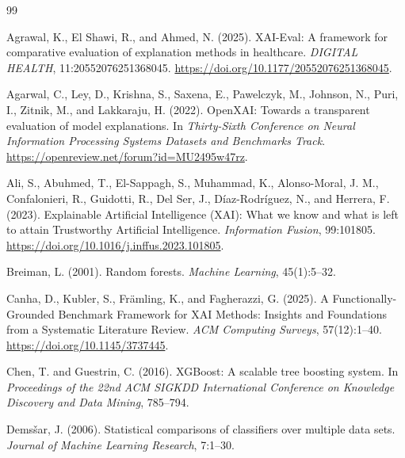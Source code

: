 \documentclass[twoside,11pt]{article}
\begin{document}
\clearpage
{}
{}
\begin{thebibliography}{99}

Agrawal, K., El Shawi, R., and Ahmed, N. (2025).
XAI-Eval: A framework for comparative evaluation of explanation methods
in healthcare.
\emph{DIGITAL HEALTH}, 11:20552076251368045.
\url{https://doi.org/10.1177/20552076251368045}.

Agarwal, C., Ley, D., Krishna, S., Saxena, E., Pawelczyk, M., Johnson, N.,
Puri, I., Zitnik, M., and Lakkaraju, H. (2022).
OpenXAI: Towards a transparent evaluation of model explanations.
In \emph{Thirty-Sixth Conference on Neural Information Processing Systems
Datasets and Benchmarks Track}.
\url{https://openreview.net/forum?id=MU2495w47rz}.

Ali, S., Abuhmed, T., El-Sappagh, S., Muhammad, K., Alonso-Moral, J. M.,
Confalonieri, R., Guidotti, R., Del Ser, J., D\'{i}az-Rodr\'{i}guez, N.,
and Herrera, F. (2023).
Explainable Artificial Intelligence (XAI): What we know and what is left
to attain Trustworthy Artificial Intelligence.
\emph{Information Fusion}, 99:101805.
\url{https://doi.org/10.1016/j.inffus.2023.101805}.

Breiman, L. (2001).
Random forests.
\emph{Machine Learning}, 45(1):5--32.

Canha, D., Kubler, S., Fr\"{a}mling, K., and Fagherazzi, G. (2025).
A Functionally-Grounded Benchmark Framework for XAI Methods: Insights
and Foundations from a Systematic Literature Review.
\emph{ACM Computing Surveys}, 57(12):1--40.
\url{https://doi.org/10.1145/3737445}.

Chen, T. and Guestrin, C. (2016).
XGBoost: A scalable tree boosting system.
In \emph{Proceedings of the 22nd ACM SIGKDD International Conference on
Knowledge Discovery and Data Mining}, 785--794.

Dems\v{s}ar, J. (2006).
Statistical comparisons of classifiers over multiple data sets.
\emph{Journal of Machine Learning Research}, 7:1--30.


\end{thebibliography}
\end{document}
